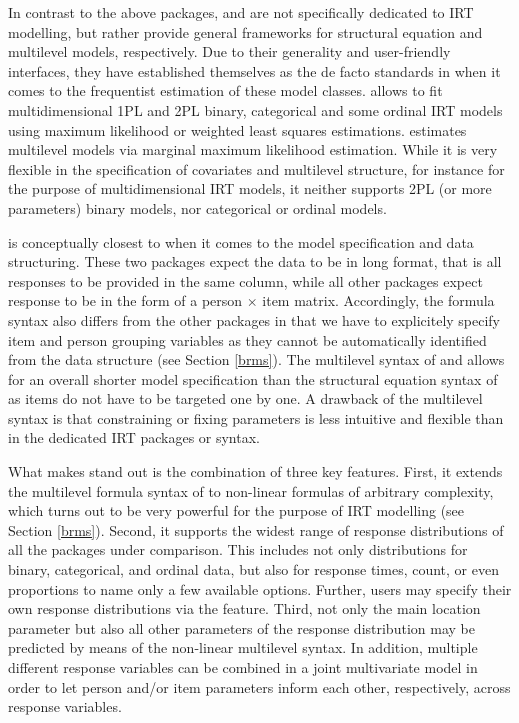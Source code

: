 \documentclass[jss]{jss}
\begin{document}
In contrast to the above packages,  and  are not
specifically dedicated to IRT modelling, but rather provide general
frameworks for structural equation and multilevel models, respectively.
Due to their generality and user-friendly interfaces, they have
established themselves as the de facto standards in  when it
comes to the frequentist estimation of these model classes. 
allows to fit multidimensional 1PL and 2PL binary, categorical and some
ordinal IRT models using maximum likelihood or weighted least squares
estimations.  estimates multilevel models via marginal maximum
likelihood estimation. While it is very flexible in the specification of
covariates and multilevel structure, for instance for the purpose of
multidimensional IRT models, it neither supports 2PL (or more
parameters) binary models, nor categorical or ordinal models.

 is conceptually closest to  when it comes to the
model specification and data structuring. These two packages expect the
data to be in long format, that is all responses to be provided in the
same column, while all other packages expect response to be in the form
of a person \(\times\) item matrix. Accordingly, the formula syntax also
differs from the other packages in that we have to explicitely specify
item and person grouping variables as they cannot be automatically
identified from the data structure (see Section \ref{brms}). The
multilevel syntax of  and  allows for an overall
shorter model specification than the structural equation syntax of
 as items do not have to be targeted one by one. A drawback
of the multilevel syntax is that constraining or fixing parameters is
less intuitive and flexible than in the dedicated IRT packages or
 syntax.

What makes  stand out is the combination of three key
features. First, it extends the multilevel formula syntax of 
to non-linear formulas of arbitrary complexity, which turns out to be
very powerful for the purpose of IRT modelling (see Section \ref{brms}).
Second, it supports the widest range of response distributions of all
the packages under comparison. This includes not only distributions for
binary, categorical, and ordinal data, but also for response times,
count, or even proportions to name only a few available options.
Further, users may specify their own response distributions via the
 feature. Third, not only the main location
parameter but also all other parameters of the response distribution may
be predicted by means of the non-linear multilevel syntax. In addition,
multiple different response variables can be combined in a joint
multivariate model in order to let person and/or item parameters inform
each other, respectively, across response variables.
\end{document}
